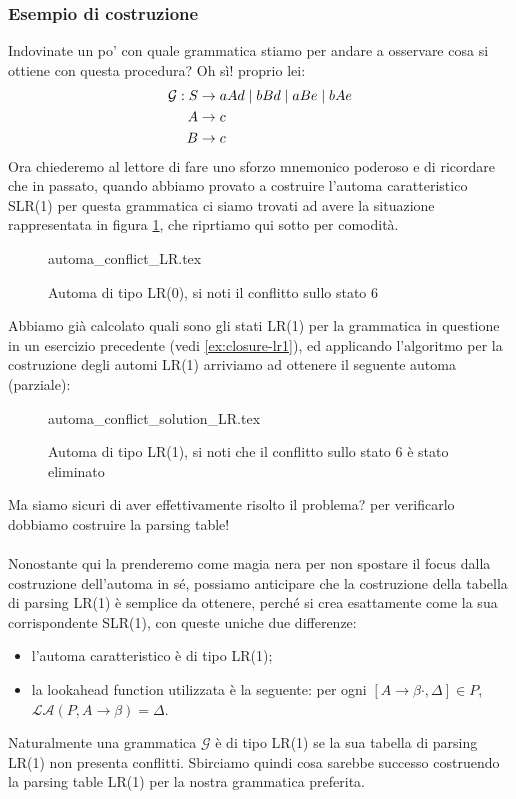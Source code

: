 \documentclass[class=book, crop=false, oneside, 12pt]{standalone}
\begin{document}
\subsubsection{Esempio di costruzione}
Indovinate un po' con quale grammatica stiamo per andare a osservare cosa si ottiene con questa procedura? Oh sì! proprio lei:
\begin{align}
    \label{eq:ex3-slr1-grammarrrrrr-again-and-again}
    \mathcal{G}: S &\to aAd \mid bBd \mid aBe \mid bAe \\
    A &\to c \nonumber \\ \notag
    B &\to c \notag
\end{align}
Ora chiederemo al lettore di fare uno sforzo mnemonico poderoso e di ricordare che in passato, quando abbiamo provato a costruire l'automa caratteristico SLR(1) per questa grammatica ci siamo trovati ad avere la situazione rappresentata in figura \ref{fig:lr0-automata_conflict}, che riprtiamo qui sotto per comodità.
\begin{figure}[H]
    \centering
    {automa_conflict_LR.tex}
    \caption{Automa di tipo LR(0), si noti il conflitto sullo stato 6}
    \label{fig:lr0-automata_conflict}
\end{figure}
Abbiamo già calcolato quali sono gli stati LR(1) per la grammatica in questione in un esercizio precedente (vedi \ref{ex:closure-lr1}), ed applicando l'algoritmo per la costruzione degli automi LR(1) arriviamo ad ottenere il seguente automa (parziale):
\begin{figure}[H]
    \centering
    {automa_conflict_solution_LR.tex}
    \caption{Automa di tipo LR(1), si noti che il conflitto sullo stato 6 è stato eliminato}
    \label{fig:lr1-automata_no-conflict}
\end{figure}
Ma siamo sicuri di aver effettivamente risolto il problema? per verificarlo dobbiamo costruire la parsing table!

\paragraph{}
Nonostante qui la prenderemo come magia nera per non spostare il focus dalla costruzione dell'automa in sé, possiamo anticipare che la costruzione della tabella di parsing LR(1) è semplice da ottenere, perché si crea esattamente come la sua corrispondente SLR(1), con queste uniche due differenze:
\begin{itemize}
    \item l'automa caratteristico è di tipo LR(1);
    \item la lookahead function utilizzata è la seguente: per ogni \([A \to \beta \cdot , \Delta] \in P\), \(\mathcal{LA}(P, A \to \beta ) = \Delta\).
\end{itemize}
Naturalmente una grammatica \(\mathcal{G}\) è di tipo LR(1) se la sua tabella di parsing LR(1) non presenta conflitti. Sbirciamo quindi cosa sarebbe successo costruendo la parsing table LR(1) per la nostra grammatica preferita.
\end{document}
